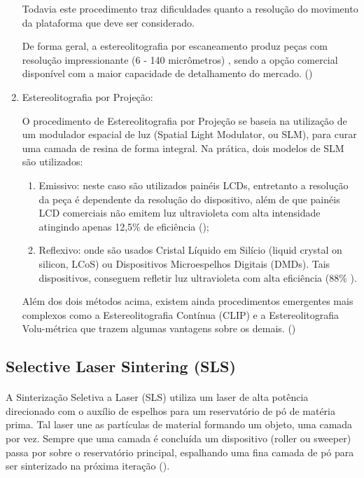\documentclass[12pt, english]{article}
\begin{document}
\begin{enumerate}[leftmargin=*, listparindent=0.7cm]
{Todavia este procedimento traz dificuldades quanto a resolução do movimento da plataforma que deve ser considerado. 

De forma geral, a estereolitografia por escaneamento produz peças com resolução impressionante (6 - 140 micrômetros) , sendo a opção comercial disponível com a maior capacidade de detalhamento do mercado. (\cite{Schmidleithner2016})
}

\item {Estereolitografia por Projeção:

O procedimento de Estereolitografia por Projeção se baseia na utilização de um modulador espacial de luz (Spatial Light Modulator, ou SLM), para curar uma camada de resina de forma integral. Na prática, dois modelos de SLM são utilizados:

\begin{enumerate}
	\item Emissivo: neste caso são utilizados painéis LCDs, entretanto a resolução da peça é dependente da resolução do dispositivo, além de que painéis LCD comerciais não emitem luz ultravioleta com alta intensidade atingindo apenas 12,5\% de eficiência (\cite{Sun2005}); 
	\item Reflexivo: onde são usados Cristal Líquido em Silício (liquid crystal on silicon, LCoS) ou Dispositivos Microespelhos Digitais (DMDs). Tais dispositivos, conseguem refletir luz ultravioleta com alta eficiência (88\% \cite{Sun2005}).
\end{enumerate}

Além dos dois métodos acima, existem ainda procedimentos emergentes mais complexos como a Estereolitografia Contínua (CLIP) e a Estereolitografia Volu-métrica que trazem algumas vantagens sobre os demais.
(\cite{Huang2020}) 
}
\end{enumerate}

\subsection{Selective Laser Sintering (SLS)}

\paragraph{}
A Sinterização Seletiva a Laser (SLS) utiliza um laser de alta potência direcionado com o auxílio de espelhos para um reservatório de pó de matéria prima. Tal laser une as partículas de material formando um objeto, uma camada por vez. Sempre que uma camada é concluída um dispositivo (roller ou sweeper) passa por sobre o reservatório principal, espalhando uma fina camada de pó para ser sinterizado na próxima iteração (\cite{Cheepu2021}).
\end{document}
